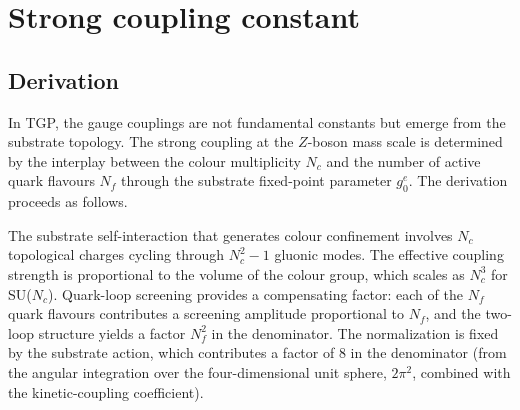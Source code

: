 \documentclass[11pt,a4paper]{article}
\newcommand{\gz}{g_0^e}
\newcommand{\Nc}{N_c}
\newcommand{\Nf}{N_f}
\begin{document}
\section{Strong coupling constant}\label{sec:alphas}

\subsection{Derivation}

In TGP, the gauge couplings are not fundamental constants but
emerge from the substrate topology.  The strong coupling at the
$Z$-boson mass scale is determined by the interplay between the
colour multiplicity $\Nc$ and the number of active quark flavours
$\Nf$ through the substrate fixed-point parameter $\gz$.
The derivation proceeds as follows.

The substrate self-interaction that generates colour confinement
involves $\Nc$ topological charges cycling through $\Nc^2 - 1$
gluonic modes.  The effective coupling strength is proportional
to the volume of the colour group, which scales as $\Nc^3$
for SU($\Nc$).  Quark-loop screening provides a compensating
factor: each of the $\Nf$ quark flavours contributes a screening
amplitude proportional to $\Nf$, and the two-loop structure yields
a factor $\Nf^2$ in the denominator.  The normalization is fixed
by the substrate action, which contributes a factor of $8$ in
the denominator (from the angular integration over the
four-dimensional unit sphere, $2\pi^2$, combined with the
kinetic-coupling coefficient).
\end{document}
